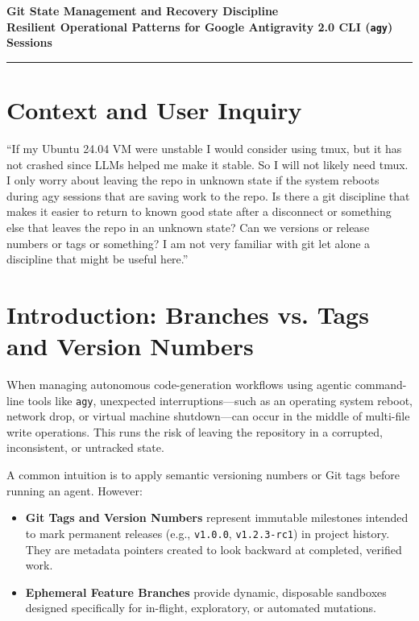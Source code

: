 \documentclass[11pt,letterpaper]{article}
\begin{document}
\begin{center}
    {\LARGE \textbf{\color{primaryblue}Git State Management and Recovery Discipline}}\\[0.4em]
    {\large \textbf{Resilient Operational Patterns for Google Antigravity 2.0 CLI (\texttt{agy}) Sessions}}\\[0.8em]
    \rule{\linewidth}{0.8pt}
\end{center}

\vspace{0.5em}

\section*{Context and User Inquiry}

\begin{promptbox}
``If my Ubuntu 24.04 VM were unstable I would consider using tmux, but it has not crashed since LLMs helped me make it stable. So I will not likely need tmux. I only worry about leaving the repo in unknown state if the system reboots during agy sessions that are saving work to the repo. Is there a git discipline that makes it easier to return to known good state after a disconnect or something else that leaves the repo in an unknown state? Can we versions or release numbers or tags or something? I am not very familiar with git let alone a discipline that might be useful here.''
\end{promptbox}

\section{Introduction: Branches vs. Tags and Version Numbers}

When managing autonomous code-generation workflows using agentic command-line tools like \texttt{agy}, unexpected interruptions—such as an operating system reboot, network drop, or virtual machine shutdown—can occur in the middle of multi-file write operations. This runs the risk of leaving the repository in a corrupted, inconsistent, or untracked state.

A common intuition is to apply semantic versioning numbers or Git tags before running an agent. However:
\begin{itemize}[leftmargin=1.5em, itemsep=0.3em]
    \item \textbf{Git Tags and Version Numbers} represent immutable milestones intended to mark permanent releases (e.g., \texttt{v1.0.0}, \texttt{v1.2.3-rc1}) in project history. They are metadata pointers created to look backward at completed, verified work.
    \item \textbf{Ephemeral Feature Branches} provide dynamic, disposable sandboxes designed specifically for in-flight, exploratory, or automated mutations.
\end{itemize}
\end{document}
